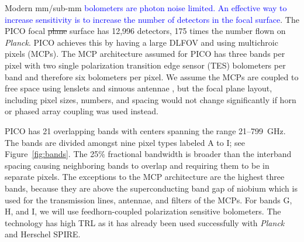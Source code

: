 \documentclass[]{spie}  %
\newcommand{\comr}[1]{\textcolor{red}{#1}}
\newcommand{\comb}[1]{\textcolor{blue}{#1}}
\begin{document}
Modern mm/sub-mm \comb{bolometers are photon noise limited. An 
effective way to increase sensitivity is to increase the number of detectors in the focal surface}. 
The PICO focal \sout{plane} surface has 12,996 detectors, 175 times the number flown on \textit{Planck}. PICO achieves this by 
having a large DLFOV and using multichroic pixels (MCPs)\cite{Suzuki2014_samps,datta2014_mcp}. 
The MCP architecture assumed for PICO has three bands per pixel with two single polarization transition 
edge sensor (TES) bolometers per band and therefore six bolometers per pixel. 
We assume the MCPs are coupled to free space using lenslets and sinuous antennae \cite{Suzuki2014_samps}, 
but the focal plane layout, including pixel sizes, numbers, and spacing would not change significantly 
if horn or phased array coupling was used instead.

PICO has 21 overlapping bands with centers spanning the range 21--799~GHz. The bands are divided amongst 
nine pixel types labeled A to I; see Figure~\ref{fig:bands}. 
The 25\% fractional bandwidth is broader than the interband spacing causing neighboring bands to 
overlap and requiring them to be in separate pixels. 
The exceptions to the MCP architecture are the highest three bands, because they are above the superconducting 
band gap of niobium which is used for the transmission lines, antennae, and filters of the MCPs.  
For bands G, H, and I, we will use feedhorn-coupled polarization sensitive bolometers. The technology has high TRL 
as it has already been used successfully with 
\textit{Planck}\cite{planck2010_hfi} and Herschel SPIRE\cite{spire2010}.
\end{document}
